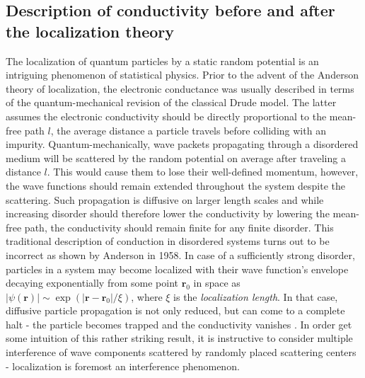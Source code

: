 \documentclass[10pt,a4paper]{article}
\begin{document}
\subsection{Description of conductivity before and after the localization theory }
The localization of quantum particles by a static random potential is an intriguing phenomenon of statistical physics. Prior to the advent of the Anderson theory of localization, the electronic conductance was usually described in terms of the quantum-mechanical revision of the classical Drude model. The latter assumes the electronic conductivity should be directly proportional to the mean-free path $l$, the average distance a particle travels before colliding with an impurity. Quantum-mechanically, wave packets propagating through a disordered medium will be scattered by the random potential on average after traveling a distance $l$. This would cause them to lose their well-defined momentum, however, the wave functions should remain extended throughout the system despite the scattering. Such propagation is diffusive on larger length scales and while increasing disorder should therefore lower the conductivity by lowering the mean-free path, the conductivity should remain finite for any finite disorder. This traditional description of conduction in disordered systems turns out to be incorrect as shown by Anderson in 1958. In case of a sufficiently strong disorder, particles in a system may become localized with their wave function's envelope decaying exponentially from some point $\mathbf{r}_0$ in space as $|\psi(\mathbf{r})| \sim \exp\left(|\mathbf{r} - \mathbf{r}_0 |/\xi \right)$, where $\xi$ is the \emph{localization length}. In that case, diffusive particle propagation is not only reduced, but can come to a complete halt - the particle becomes trapped and the conductivity vanishes \cite{self-consistent}. In order get some intuition of this rather striking result, it is instructive to consider multiple interference of wave components scattered by randomly placed scattering centers - localization is foremost an interference phenomenon.
\end{document}
